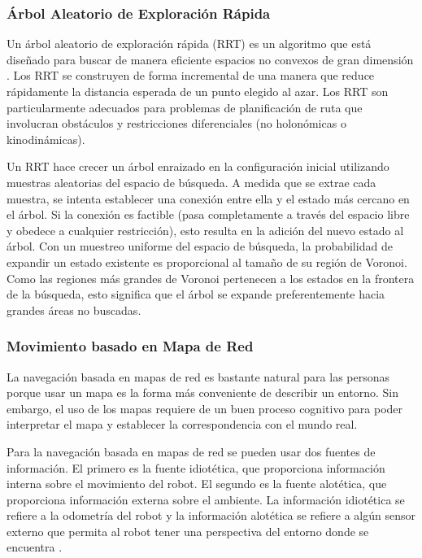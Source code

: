 \subsubsection{\'Arbol Aleatorio de Exploraci\'on R\'apida}
Un árbol aleatorio de exploración rápida (RRT) es un algoritmo que está 
diseñado para buscar de manera eficiente espacios no convexos de gran 
dimensión \cite{bry2011rapidly}. Los RRT se construyen de forma incremental 
de una manera que reduce rápidamente la distancia esperada de un punto elegido 
al azar. Los RRT son particularmente adecuados para problemas de planificación 
de ruta que involucran obstáculos y restricciones diferenciales (no holonómicas 
o kinodinámicas).

Un RRT hace crecer un árbol enraizado en la configuración inicial utilizando 
muestras aleatorias del espacio de búsqueda. A medida que se extrae cada 
muestra, se intenta establecer una conexión entre ella y el estado más cercano 
en el árbol. Si la conexión es factible (pasa completamente a través del espacio 
libre y obedece a cualquier restricción), esto resulta en la adición del nuevo 
estado al árbol. Con un muestreo uniforme del espacio de búsqueda, la 
probabilidad de expandir un estado existente es proporcional al tamaño de su 
región de Voronoi. Como las regiones más grandes de Voronoi pertenecen a los 
estados en la frontera de la búsqueda, esto significa que el árbol se expande 
preferentemente hacia grandes áreas no buscadas. 

\subsubsection{Movimiento basado en Mapa de Red}
\label{sec:MapRed}
La navegación basada en mapas de red es bastante natural para las personas 
porque usar un mapa es la forma más conveniente de describir un entorno. Sin 
embargo, el uso de los mapas requiere de un buen proceso cognitivo para poder 
interpretar el mapa y establecer la correspondencia con el mundo real.

Para la navegación basada en mapas de red se pueden usar dos fuentes de 
información. El primero es la fuente idiotética, que proporciona información 
interna sobre el movimiento del robot. El segundo es la fuente alotética, que 
proporciona información externa sobre el ambiente. La información idiotética 
se refiere a la odometría del robot y la información alotética se refiere a 
algún sensor externo que permita al robot tener una perspectiva del entorno 
donde se encuentra \cite{thrun2003learning}.

